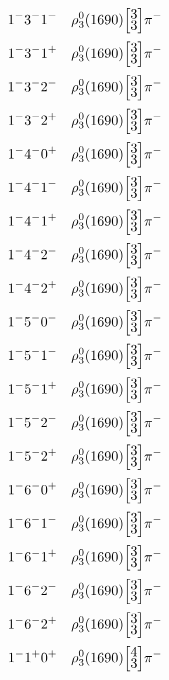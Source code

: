 \documentclass[10pt,a4paper]{article}
\def\dst{\displaystyle}
\def\vsp{\hbox{\vrule height12.5pt depth3.5pt width0pt}}
\def\ells#1#2{\Big[\hskip-5pt\vsp\begin{array}{c}\dst#1\\[-4pt]\dst#2\end{array}\vsp\hskip-5pt\Big]}
\begin{document}
\begin{align*} 
 \begin{aligned}
1^{-}3^{-}1^{-}\quad & \rho_3^0(1690)\ells{3}{3}\pi^-\\
1^{-}3^{-}1^{+}\quad & \rho_3^0(1690)\ells{3}{3}\pi^-\\
1^{-}3^{-}2^{-}\quad & \rho_3^0(1690)\ells{3}{3}\pi^-\\
1^{-}3^{-}2^{+}\quad & \rho_3^0(1690)\ells{3}{3}\pi^-\\
1^{-}4^{-}0^{+}\quad & \rho_3^0(1690)\ells{3}{3}\pi^-\\
1^{-}4^{-}1^{-}\quad & \rho_3^0(1690)\ells{3}{3}\pi^-\\
1^{-}4^{-}1^{+}\quad & \rho_3^0(1690)\ells{3}{3}\pi^-\\
1^{-}4^{-}2^{-}\quad & \rho_3^0(1690)\ells{3}{3}\pi^-\\
1^{-}4^{-}2^{+}\quad & \rho_3^0(1690)\ells{3}{3}\pi^-\\
1^{-}5^{-}0^{-}\quad & \rho_3^0(1690)\ells{3}{3}\pi^-\\
1^{-}5^{-}1^{-}\quad & \rho_3^0(1690)\ells{3}{3}\pi^-\\
1^{-}5^{-}1^{+}\quad & \rho_3^0(1690)\ells{3}{3}\pi^-\\
1^{-}5^{-}2^{-}\quad & \rho_3^0(1690)\ells{3}{3}\pi^-\\
1^{-}5^{-}2^{+}\quad & \rho_3^0(1690)\ells{3}{3}\pi^-\\
1^{-}6^{-}0^{+}\quad & \rho_3^0(1690)\ells{3}{3}\pi^-\\
1^{-}6^{-}1^{-}\quad & \rho_3^0(1690)\ells{3}{3}\pi^-\\
1^{-}6^{-}1^{+}\quad & \rho_3^0(1690)\ells{3}{3}\pi^-\\
1^{-}6^{-}2^{-}\quad & \rho_3^0(1690)\ells{3}{3}\pi^-\\
1^{-}6^{-}2^{+}\quad & \rho_3^0(1690)\ells{3}{3}\pi^-\\
1^{-}1^{+}0^{+}\quad & \rho_3^0(1690)\ells{4}{3}\pi^-\\
\end{aligned} 
 \end{align*}\pagebreak
\end{document}
